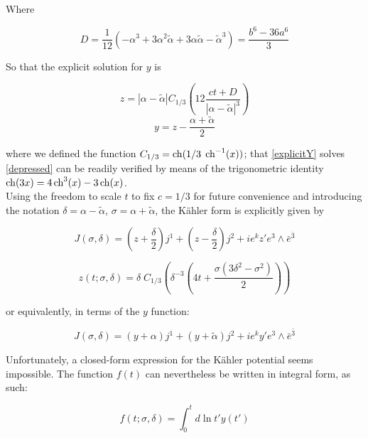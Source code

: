 Where

\begin{equation}
	D = \frac{1}{12}(-\alpha^3 + 3 \alpha^2 \tilde\alpha + 3 \alpha\tilde{\alpha} - \tilde{\alpha}^3) = \frac{b^6-36a^6}{3}
	\label{dprime}
\end{equation}

So that the explicit solution for $y$ is

\begin{equation}
	z = |\alpha - \tilde \alpha| C_{1/3} \left( 12 \frac{ct + D}{|\alpha-\tilde\alpha|^3} \right) 
	\label{explicitz}
\end{equation}
\begin{equation}
	y = z - \frac{\alpha + \tilde{\alpha}}2
	\label{explicitY}
\end{equation}

where we defined the function $C_{1/3} = \operatorname{ch}(1/3 \; \operatorname{ch}^{-1}(x))$; that \ref{explicitY} solves \ref{depressed} can be readily verified by means of the trigonometric identity $\operatorname{ch}(3x) = 4 \operatorname{ch}^3(x) - 3 \operatorname{ch}(x)$.\\

Using the freedom to scale $t$ to fix $c=1/3$ for future convenience and introducing the notation $\delta = \alpha - \tilde{\alpha}$, $\sigma = \alpha + \tilde{\alpha}$, the K\"ahler form is explicitly given by

\begin{equation}
	J(\sigma,\delta) = \left(  z + \frac{\delta}{2}\right) j^1 + \left(z-\frac{\delta}{2}\right) j^2 + ie^k z' e^3 \wedge \bar e^{\bar 3}
	\label{}
\end{equation}

\begin{equation}
	z(t;\sigma,\delta) = \delta \;C_{1/3} \left( \delta^{-3} \left( 4t + \frac{\sigma(3\delta^2 - \sigma^2)}{2} \right) \right)
	\label{}
\end{equation}

or equivalently, in terms of the $y$ function:

\begin{equation}
	J(\sigma,\delta) = (y+\alpha) j^1 + (y+\tilde{\alpha})j^2 + ie^k y' e^3 \wedge \bar e^{\bar 3}
	\label{}
\end{equation}

Unfortunately, a closed-form expression for the K\"ahler potential seems impossible. The function $f(t)$ can nevertheless be written in integral form, as such:

\begin{equation}
	f(t;\sigma,\delta) = \int_0^{t} d\ln t' y(t')
	\label{}
\end{equation}

